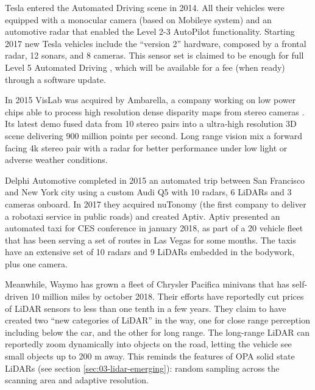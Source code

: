 Tesla entered the Automated Driving scene in 2014.
All their vehicles were equipped with a monocular camera (based on 
Mobileye system) and an automotive radar that enabled the Level 2-3 AutoPilot
functionality. 
Starting 2017 new Tesla vehicles include the ``version 2'' hardware, 
composed by a frontal radar, 12 sonars, and 8 cameras.
This sensor set is claimed to be enough for full Level 5 Automated Driving
\cite{Hawkins2017}, which will be available for a fee (when ready) through a
software update.

In 2015 VisLab was acquired by Ambarella, a company working on low power chips
able to process high resolution dense disparity maps from stereo cameras
\cite{Ambarella2018}. 
Its latest demo \cite{AUVSI2018} fused data from 10 stereo pairs into a
ultra-high resolution 3D scene delivering 900 million points per second.
Long range vision mix a forward facing 4k stereo pair with a radar for better
performance under low light or adverse weather conditions. 

Delphi Automotive completed in 2015 an automated trip between San Francisco and
New York city using a custom Audi Q5 with 10 radars, 6 LiDARs and 3 cameras 
onboard. In 2017 they acquired nuTonomy (the first company to deliver a 
robotaxi service in public roads) and created Aptiv. 
Aptiv presented an automated taxi for CES conference in january 2018, as part
of a 20 vehicle fleet that has been serving a set of routes in Las Vegas for
some months. The taxis have an extensive set of 10 radars and 9 LiDARs embedded 
in the bodywork, plus one camera.

Meanwhile, Waymo has grown a fleet of Chrysler Pacifica minivans that has
self-driven 10 million miles by october 2018. Their efforts have reportedly 
cut prices of LiDAR sensors to less than one tenth in a few years. 
They claim to have created two ``new categories of LiDAR'' \cite{Waymoteam2017} 
in the way, one for close range perception including below the car, and the
other for long range. The long-range LiDAR can reportedly zoom dynamically into 
objects on the road, letting the vehicle see small objects up to 200 m away. 
This reminds the features of OPA solid state LiDARs (see section
\ref{sec:03-lidar-emerging}): random sampling across the 
scanning area and adaptive resolution.

